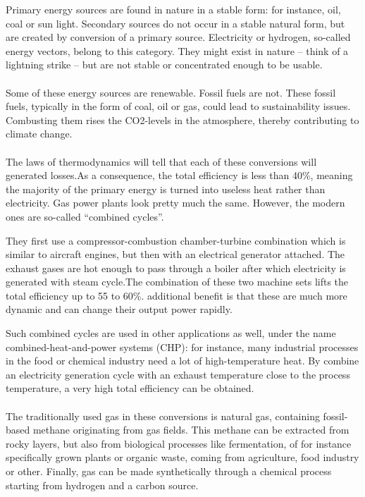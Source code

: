 \documentclass[../summary.tex]{subfiles}
\begin{document}
	Primary energy sources are found in nature in a stable form: for instance, oil, coal or sun light. Secondary sources do not occur in a stable natural form, but are created by conversion of a primary source. Electricity or hydrogen, so-called energy vectors, belong to this category. They might exist in nature – think of a lightning strike – but are not stable or concentrated enough to be usable.
	\\\\
	Some of these energy sources are renewable. Fossil fuels are not. These fossil fuels, typically in the form of coal, oil or gas, could lead to sustainability issues. Combusting them rises the CO2-levels in the atmosphere, thereby contributing to climate change. 
	\\\\
	The laws of thermodynamics will tell that each of these conversions will generated losses.As a consequence, the total efficiency is less than 40\%, meaning the majority of the primary energy is turned into useless heat rather than electricity. Gas power plants look pretty much the same. However, the modern ones are so-called “combined cycles”.
	
	They first use a compressor-combustion chamber-turbine combination which is similar to aircraft engines, but then with an electrical generator attached. The exhaust gases are hot enough to pass through a boiler after which electricity is generated with steam cycle.The combination of these two machine sets lifts the total efficiency up to 55 to 60\%. additional benefit is that these are much more dynamic and can change their output power rapidly.
	
	Such combined cycles are used in other applications as well, under the name combined-heat-and-power systems (CHP): for instance, many industrial processes in the food or chemical industry need a lot of high-temperature heat. By combine an electricity generation cycle with an exhaust temperature close to the process temperature, a very high total efficiency can be obtained.
	\\\\
	The traditionally used gas in these conversions is natural gas, containing fossil-based methane originating from gas fields. This methane can be extracted from rocky layers, but also from biological processes like fermentation, of for instance specifically grown plants or organic waste, coming from agriculture, food industry or other. Finally, gas can be made synthetically through a chemical process starting from hydrogen and a carbon source.
	
\end{document}
